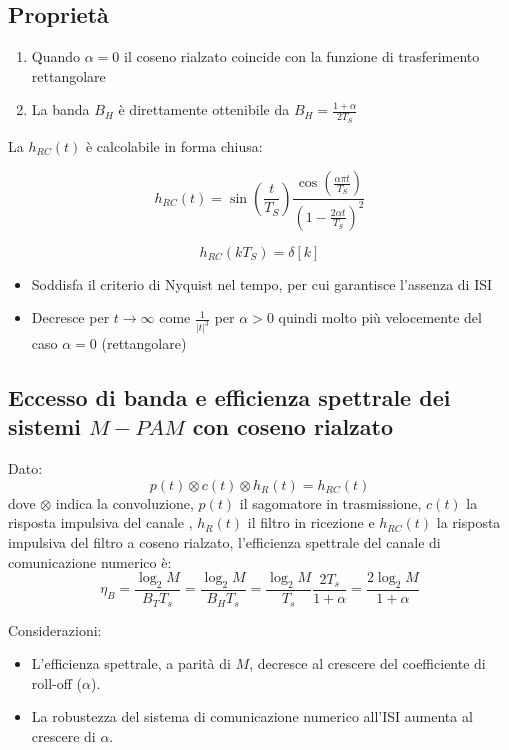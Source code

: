\subsection*{Propriet\`a}
\begin{enumerate}
    \item Quando \( \alpha = 0 \) il coseno rialzato coincide con la funzione di trasferimento rettangolare
    \item La banda \( B_H \) \`e direttamente ottenibile da \( B_H = \frac{1+\alpha}{2T_S} \)
\end{enumerate}

La \( h_{RC}(t) \) \`e calcolabile in forma chiusa:

\[ h_{RC}(t) = \sin\left(\frac{t}{T_S}\right) \frac{\cos\left(\frac{\alpha \pi t}{T_S}\right)}{\left(1- \frac{2\alpha t}{T_S}\right)^2}  \]

\[ h_{RC}(kT_S) = \delta[k] \]

\begin{itemize}
    \item Soddisfa il criterio di Nyquist nel tempo, per cui garantisce l'assenza di ISI
    \item Decresce per \( t \rightarrow \infty \) come \( \frac{1}{|t|^3} \) per \( \alpha > 0 \) quindi molto pi\`u velocemente del caso \( \alpha = 0 \) (rettangolare)
\end{itemize}




\subsection*{Eccesso di banda e efficienza spettrale dei sistemi \( M-PAM \) con coseno rialzato}

Dato:
\[ p(t) \otimes c(t) \otimes h_R(t) = h_{RC}(t) \]
dove \( \otimes \) indica la convoluzione, $p(t)$ il sagomatore in trasmissione, $c(t)$ la risposta impulsiva del canale , $h_R(t)$ il filtro in ricezione e \( h_{RC}(t) \) la risposta impulsiva del filtro a coseno rialzato, l'efficienza spettrale del canale di comunicazione numerico è:
\[ \eta_{B} = \frac{\log_2M}{B_T T_s} = \frac{\log_2M}{B_H T_s} = \frac{\log_2M}{ T_s} \frac{2T_s}{1+\alpha} = \frac{2\log_2M}{1+\alpha}\]

Considerazioni:
\begin{itemize}
    \item L'efficienza spettrale, a parità di \( M \), decresce al crescere del coefficiente di roll-off (\( \alpha \)).
    \item La robustezza del sistema di comunicazione numerico all'ISI aumenta al crescere di \( \alpha \).
\end{itemize}

